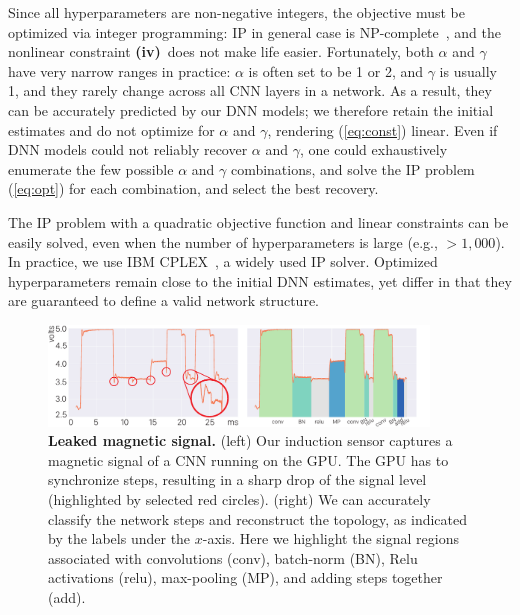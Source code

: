 \documentclass[12pt]{report}
\newcommand{\Liv}{\textbf{(iv)}\ }
\begin{document}
Since all hyperparameters are non-negative integers,
the objective must be optimized via integer programming: 
IP in general case is NP-complete~\cite{papadimitriou1998combinatorial}, 
and the nonlinear constraint \Liv does not make life easier.
Fortunately, both $\alpha$ and $\gamma$ have very narrow ranges in practice:
$\alpha$ is often set to be 1 or 2, and $\gamma$ is usually 1, and they rarely change
across all CNN layers in a network.
As a result, they can be accurately predicted by our DNN models; we therefore retain
the initial estimates and do not optimize for $\alpha$ and $\gamma$,
rendering (\ref{eq:const}) linear.
Even if DNN models could not reliably recover $\alpha$ and $\gamma$, 
one could exhaustively enumerate the few possible $\alpha$ and $\gamma$ combinations,
and solve the IP problem (\ref{eq:opt}) for each combination, and select the best recovery.

The IP problem with a quadratic objective function and linear constraints can be easily
solved, even when the number of hyperparameters is large (e.g., $>1,000$). 
In practice, we use IBM CPLEX~\cite{cplex2009v12}, a widely used IP solver.
Optimized hyperparameters remain close to the initial DNN estimates, yet differ in that
they are guaranteed to define a valid network structure.


\begin{figure}[H]
    \centering
    \includegraphics[width=0.90\textwidth]{figs/Fig1-3-prettier.pdf}
    \vspace{-2mm}
    \caption{\textbf{Leaked magnetic signal.} 
    (left) Our induction sensor captures a magnetic signal of 
    a CNN running on the GPU.
    The GPU has to synchronize steps, resulting in 
    a sharp drop of the signal level (highlighted by selected red circles).
    (right) We can accurately classify the network steps and reconstruct the topology, as indicated by the labels under the $x$-axis. Here we highlight the signal regions associated with convolutions (conv), batch-norm (BN), Relu activations (relu), max-pooling (MP), and adding steps together (add).
    \label{fig:signalClass}}
    \vspace{-8mm}
\end{figure}
\end{document}
